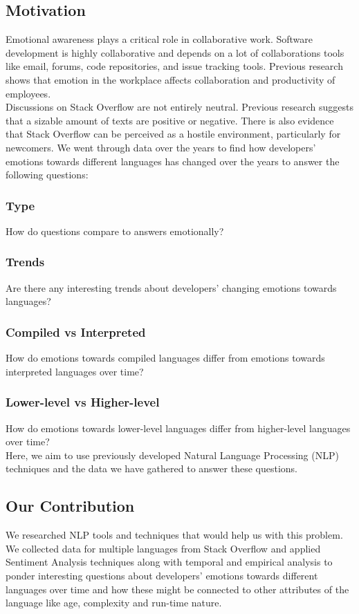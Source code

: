 \documentclass[conference]{IEEEtran}
\begin{document}
\subsection{Motivation}
Emotional awareness plays a critical role in collaborative work. Software development is highly collaborative and depends on a lot of collaborations tools like email, forums, code repositories, and issue tracking tools\cite{b1}. Previous research shows that emotion in the workplace affects collaboration and productivity of employees\cite{b2}. \\

Discussions on Stack Overflow are not entirely neutral. Previous research suggests that a sizable amount of texts are positive or negative\cite{b3, b4, b5}. There is also evidence that Stack Overflow can be perceived as a hostile environment, particularly for newcomers\cite{b6}. We went through data over the years to find how developers' emotions towards different languages has changed over the years to answer the following questions:\\
 \subsubsection{Type}How do questions compare to answers emotionally?
 \subsubsection{Trends}Are there any interesting trends about developers' changing emotions towards languages?
 \subsubsection{Compiled vs Interpreted}How do emotions towards compiled languages differ from emotions towards interpreted languages over time?
 \subsubsection{Lower-level vs Higher-level} How do emotions towards lower-level languages differ from higher-level languages over time?\\
 

Here, we aim to use previously developed Natural Language Processing (NLP) techniques and the data we have gathered to answer these questions.

\subsection{Our Contribution}
We researched NLP tools and techniques that would help us with this problem. We collected data for multiple languages from Stack Overflow and applied Sentiment Analysis techniques along with temporal and empirical analysis to ponder interesting questions about developers' emotions towards different languages over time and how these might be connected to other attributes of the language like age, complexity and run-time nature.\\
\end{document}
